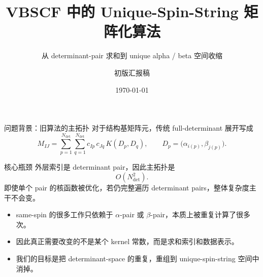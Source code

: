 \documentclass[aspectratio=169,professionalfonts]{ctexbeamer}
\title[Unique-Spin-String for VBSCF]{VBSCF 中的 Unique-Spin-String 矩阵化算法}
\subtitle{从 determinant-pair 求和到 unique alpha / beta 空间收缩}
\author{初版汇报稿}
\institute{xmvb-cpp project}
\date{\today}
\newcommand{\Dfull}{N_{\mathrm{det}}}
\begin{document}
\begin{frame}
  \titlepage
\end{frame}

\begin{frame}{问题背景：旧算法的主拓扑}
  \small
  对于结构基矩阵元，传统 full-determinant 展开写成
  \[
  M_{IJ}
  =
  \sum_{p=1}^{\Dfull}
  \sum_{q=1}^{\Dfull}
  c_{Ip}\, c_{Jq}\, K(D_p, D_q),
  \qquad
  D_p = \bigl(\alpha_{i(p)}, \beta_{j(p)}\bigr).
  \]

  \vspace{0.4em}
  \begin{block}{核心瓶颈}
    外层索引是 determinant pair，因此主拓扑是
    \[
    O(\Dfull^2).
    \]
    即使单个 pair 的核函数被优化，若仍完整遍历 determinant pairs，整体复杂度主干不会变。
  \end{block}

  \begin{itemize}
    \item same-spin 的很多工作只依赖于 \(\alpha\)-pair 或 \(\beta\)-pair，本质上被重复计算了很多次。
    \item 因此真正需要改变的不是某个 kernel 常数，而是求和索引和数据表示。
    \item 我们的目标是把 determinant-space 的重复，重组到 unique-spin-string 空间中消掉。
  \end{itemize}
\end{frame}
\end{document}

